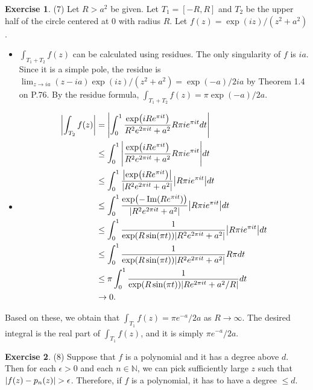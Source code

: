 \documentclass[12pt, psamsfonts]{amsart}
\theoremstyle{definition}
\newtheorem*{exer}{Exercise}
\theoremstyle{remark}
\numberwithin{equation}{section}
\begin{document}
\begin{exer}{(7)}
  Let $R > a^2$ be given.
  Let $T_1 = [-R, R]$ and $T_2$ be the upper half of the circle centered at 0 with radius $R$.
  Let $f(z) = \exp(iz) / (z^2 + a^2)$.

  \begin{itemize}
    \item
      $\int_{T_1 + T_2} f(z)$ can be calculated using residues.
      The only singularity of $f$ is $ia$.
      Since it is a simple pole, the residue is $\lim_{z \rightarrow ia} (z - ia)\exp(iz) / (z^2 + a^2) = \exp(-a) / 2ia$ by Theorem 1.4 on P.76.
      By the residue formula, $\int_{T_1 + T_2} f(z) = \pi\exp(-a) / 2a$.
    \item
      \begin{align*}
        \abs{\int_{T_2} f(z)}
          &= \abs{\int_{0}^{1} \frac{\exp(iRe^{\pi i t})}{R^2e^{2\pi it} + a^2} R\pi i e^{\pi i t} dt} \\
          &\leq \int_{0}^{1} \abs{\frac{\exp(iRe^{\pi i t})}{R^2e^{2\pi it} + a^2} R\pi i e^{\pi i t}} dt \\
          &\leq \int_{0}^{1} \frac{\abs{\exp(iRe^{\pi i t})}}{\abs{R^2e^{2\pi it} + a^2}} \abs{R\pi i e^{\pi i t}} dt \\
          &\leq \int_{0}^{1} \frac{\exp(-\Im(R e^{\pi i t}))}{\abs{R^2e^{2\pi it} + a^2}} \abs{R\pi i e^{\pi i t}} dt \\
          &\leq \int_{0}^{1} \frac{1}{\exp(R\sin(\pi t))\abs{R^2e^{2\pi it} + a^2}} \abs{R\pi i e^{\pi i t}} dt \\
          &\leq \int_{0}^{1} \frac{1}{\exp(R\sin(\pi t))\abs{R^2e^{2\pi it} + a^2}} R\pi dt \\
          &\leq \pi \int_{0}^{1} \frac{1}{\exp(R\sin(\pi t))\abs{Re^{2\pi it} + a^2 / R}} dt \\
          &\rightarrow 0. %
      \end{align*}
  \end{itemize}
  Based on these, we obtain that $\int_{T_1} f(z) = \pi e^{-a} / 2a$ as $R \rightarrow \infty$.
  The desired integral is the real part of $\int_{T_1} f(z)$, and it is simply $\pi e^{-a} / 2a$.
\end{exer}

\begin{exer}{(8)}
  Suppose that $f$ is a polynomial and it has a degree above $d$.
  Then for each $\epsilon > 0$ and each $n \in \mathbb{N}$, we can pick sufficiently large $z$ such that $\abs{f(z) - p_n(z)} > \epsilon$.
  Therefore, if $f$ is a polynomial, it has to have a degree $\leq d$.
\end{exer}
\end{document}
